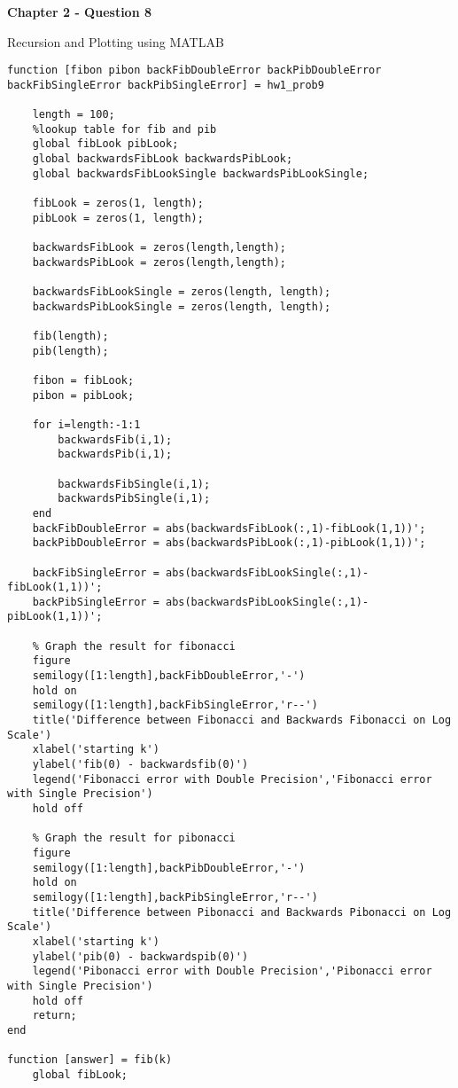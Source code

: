 \documentclass{article}
\begin{document}
\textbf{Chapter 2 - Question 8}

Recursion and Plotting using MATLAB 
\begin{lstlisting}
function [fibon pibon backFibDoubleError backPibDoubleError backFibSingleError backPibSingleError] = hw1_prob9

    length = 100;
    %lookup table for fib and pib
    global fibLook pibLook;
    global backwardsFibLook backwardsPibLook;
    global backwardsFibLookSingle backwardsPibLookSingle;
    
    fibLook = zeros(1, length);
    pibLook = zeros(1, length);
    
    backwardsFibLook = zeros(length,length);
    backwardsPibLook = zeros(length,length);
    
    backwardsFibLookSingle = zeros(length, length);
    backwardsPibLookSingle = zeros(length, length);
    
    fib(length);
    pib(length);
    
    fibon = fibLook;
    pibon = pibLook;
    
    for i=length:-1:1
        backwardsFib(i,1);
        backwardsPib(i,1);
        
        backwardsFibSingle(i,1);
        backwardsPibSingle(i,1);
    end
    backFibDoubleError = abs(backwardsFibLook(:,1)-fibLook(1,1))';
    backPibDoubleError = abs(backwardsPibLook(:,1)-pibLook(1,1))';
    
    backFibSingleError = abs(backwardsFibLookSingle(:,1)-fibLook(1,1))';
    backPibSingleError = abs(backwardsPibLookSingle(:,1)-pibLook(1,1))';    
    
    % Graph the result for fibonacci
    figure
    semilogy([1:length],backFibDoubleError,'-')
    hold on
    semilogy([1:length],backFibSingleError,'r--')
    title('Difference between Fibonacci and Backwards Fibonacci on Log Scale')
    xlabel('starting k')
    ylabel('fib(0) - backwardsfib(0)')
    legend('Fibonacci error with Double Precision','Fibonacci error with Single Precision')
    hold off
    
    % Graph the result for pibonacci
    figure
    semilogy([1:length],backPibDoubleError,'-')
    hold on 
    semilogy([1:length],backPibSingleError,'r--')
    title('Difference between Pibonacci and Backwards Pibonacci on Log Scale')
    xlabel('starting k')
    ylabel('pib(0) - backwardspib(0)')
    legend('Pibonacci error with Double Precision','Pibonacci error with Single Precision')
    hold off
    return;
end

function [answer] = fib(k)
    global fibLook;
    

\end{lstlisting}
\end{document}
